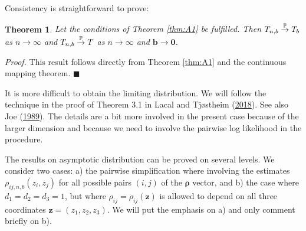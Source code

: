 \documentclass[
  12pt,
  letterpaper]{article}
\newtheorem{thm}{Theorem}[section]
\numberwithin{equation}{section}
\newcommand{\z}{\bm{z}}
\newcommand{\frho}{\bm{\rho}}
\newcommand{\bb}{\bm{b}}
\begin{document}
Consistency is straightforward to prove:

\begin{thm}
Let the conditions of Theorem \ref{thm:A1} be fulfilled. Then $T_{n,b} \buildrel {\mathbb{P}} \over {\to} T_b$ as $n \to \infty$ and $T_{n,b} \buildrel {\mathbb{P}} \over {\to} T$ as $n \to \infty$ and $\bb \to \bm{0}$.
\label{thm:F1}
\end{thm}

\emph{Proof.} This result follows directly from Theorem \ref{thm:A1} and the continuous mapping theorem. \(\blacksquare\)

It is more difficult to obtain the limiting distribution. We will follow the technique in the proof of Theorem 3.1 in Lacal and Tjøstheim (\protect\hyperlink{ref-lacal2018estimating}{2018}). See also Joe (\protect\hyperlink{ref-joe1989estimation}{1989}). The details are a bit more involved in the present case because of the larger dimension and because we need to involve the pairwise log likelihood in the procedure.

The results on asymptotic distribution can be proved on several levels. We consider two cases: a) the pairwise simplification where involving the estimates \(\rho_{ij,n,b}(z_i,z_j)\) for all possible pairs \((i,j)\) of the \(\frho\) vector, and b) the case where \(d_1=d_2=d_3=1\), but where \(\rho_{ij} = \rho_{ij}(\z)\) is allowed to depend on all three coordinates \(\z=(z_1,z_2,z_3)\). We will put the emphasis on a) and only comment briefly on b).
\end{document}
